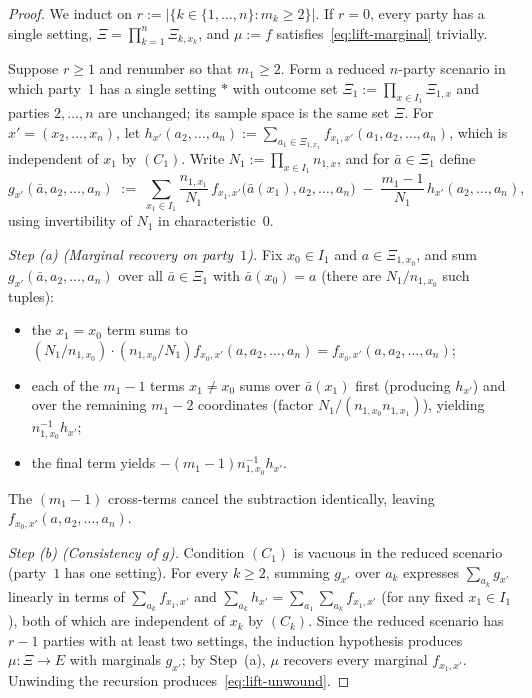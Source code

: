 \documentclass[11pt,a4paper]{article}
\theoremstyle{definition}
\theoremstyle{remark}
\begin{document}
\begin{proof}
We induct on $r := |\{k \in \{1,\dots,n\} : m_k \ge 2\}|$. If $r = 0$, every party has a single setting, $\Xi = \prod_{k=1}^n \Xi_{k,x_k}$, and $\mu := f$ satisfies~\eqref{eq:lift-marginal} trivially.

Suppose $r \ge 1$ and renumber so that $m_1 \ge 2$. Form a reduced $n$-party scenario in which party~$1$ has a single setting $\ast$ with outcome set $\Xi_1 := \prod_{x \in I_1} \Xi_{1,x}$ and parties $2,\dots,n$ are unchanged; its sample space is the same set $\Xi$. For $x' = (x_2,\dots,x_n)$, let $h_{x'}(a_2,\dots,a_n) := \sum_{a_1 \in \Xi_{1,x_1}} f_{x_1,x'}(a_1,a_2,\dots,a_n)$, which is independent of $x_1$ by $(C_1)$. Write $N_1 := \prod_{x \in I_1} n_{1,x}$, and for $\bar{a} \in \Xi_1$ define
\[
g_{x'}(\bar{a}, a_2,\dots,a_n) \;:=\; \sum_{x_1 \in I_1} \frac{n_{1,x_1}}{N_1}\, f_{x_1,x'}\bigl(\bar{a}(x_1), a_2,\dots,a_n\bigr)
\;-\; \frac{m_1 - 1}{N_1}\, h_{x'}(a_2,\dots,a_n),
\]
using invertibility of $N_1$ in characteristic~$0$.

\emph{Step (a) (Marginal recovery on party~$1$).} Fix $x_0 \in I_1$ and $a \in \Xi_{1,x_0}$, and sum $g_{x'}(\bar{a}, a_2,\dots,a_n)$ over all $\bar{a} \in \Xi_1$ with $\bar{a}(x_0) = a$ (there are $N_1/n_{1,x_0}$ such tuples):
\begin{itemize}[leftmargin=*,nosep]
\item the $x_1 = x_0$ term sums to $(N_1/n_{1,x_0}) \cdot (n_{1,x_0}/N_1) f_{x_0,x'}(a,a_2,\dots,a_n) = f_{x_0,x'}(a,a_2,\dots,a_n)$;
\item each of the $m_1 - 1$ terms $x_1 \neq x_0$ sums over $\bar{a}(x_1)$ first (producing $h_{x'}$) and over the remaining $m_1 - 2$ coordinates (factor $N_1/(n_{1,x_0} n_{1,x_1})$), yielding $n_{1,x_0}^{-1} h_{x'}$;
\item the final term yields $-(m_1 - 1) n_{1,x_0}^{-1} h_{x'}$.
\end{itemize}
The $(m_1 - 1)$ cross-terms cancel the subtraction identically, leaving $f_{x_0,x'}(a, a_2,\dots,a_n)$.

\emph{Step (b) (Consistency of $g$).} Condition $(C_1)$ is vacuous in the reduced scenario (party~$1$ has one setting). For every $k \ge 2$, summing $g_{x'}$ over $a_k$ expresses $\sum_{a_k} g_{x'}$ linearly in terms of $\sum_{a_k} f_{x_1, x'}$ and $\sum_{a_k} h_{x'} = \sum_{a_1}\sum_{a_k} f_{x_1, x'}$ (for any fixed $x_1 \in I_1$), both of which are independent of $x_k$ by $(C_k)$. Since the reduced scenario has $r - 1$ parties with at least two settings, the induction hypothesis produces $\mu : \Xi \to E$ with marginals $g_{x'}$; by Step~(a), $\mu$ recovers every marginal $f_{x_1, x'}$. Unwinding the recursion produces~\eqref{eq:lift-unwound}.
\end{proof}
\end{document}

